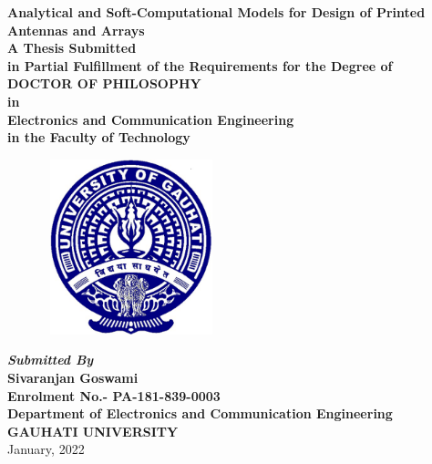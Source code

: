 \begin{titlepage}
\begin{center}
{\Large \bf Analytical and Soft-Computational Models for Design of Printed Antennas and Arrays} \\ [5ex]

\vspace{2in}
{\normalsize{ \textbf{A Thesis Submitted \\in
 Partial Fulfillment of the Requirements for the Degree of \\\large \bf
DOCTOR OF PHILOSOPHY\\
in \\
Electronics and Communication Engineering \\
in the Faculty of Technology}}}\\
\vspace{2in}
\begin{figure}[h]
    \centering
\includegraphics[width=2.0in,height=2.0in]{clogoe.eps}\\
\end{figure}
\vspace{2in}
{\sl \textbf{Submitted By}} \\[2ex]
{\sf \sf \textbf{Sivaranjan Goswami\\
Enrolment No.- PA-181-839-0003}}\\[10ex]
{\large \bf Department of Electronics and Communication Engineering}  \\[1ex]
{\large \bf{GAUHATI UNIVERSITY}} \\[1ex]
{\normalsize January, 2022 }
\end{center}
\end{titlepage}
